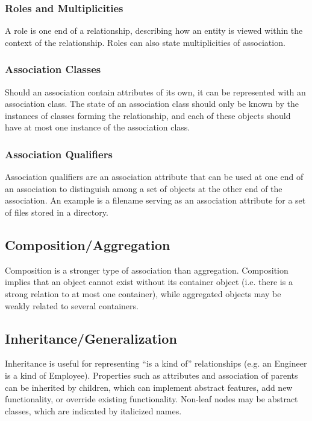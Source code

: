 \documentclass[12pt,titlepage]{article}
\begin{document}
      \subsubsection{Roles and Multiplicities}
        A role is one end of a relationship, describing how an entity is viewed within the context of the relationship. Roles can also state multiplicities of association.

      \subsubsection{Association Classes}
        Should an association contain attributes of its own, it can be represented with an association class. The state of an association class should only be known by the instances
        of classes forming the relationship, and each of these objects should have at most one instance of the association class.

      \subsubsection{Association Qualifiers}
        Association qualifiers are an association attribute that can be used at one end of an association to distinguish among a set of objects at the other end of the association.
        An example is a filename serving as an association attribute for a set of files stored in a directory.

    \subsection{Composition/Aggregation}
      Composition is a stronger type of association than aggregation. Composition implies that an object cannot exist without its container object (i.e. there is a strong relation to
      at most one container), while aggregated objects may be weakly related to several containers.

    \subsection{Inheritance/Generalization}
      Inheritance is useful for representing ``is a kind of'' relationships (e.g. an Engineer is a kind of Employee). Properties such as attributes and association of parents can be
      inherited by children, which can implement abstract features, add new functionality, or override existing functionality. Non-leaf nodes may be abstract classes, which are
      indicated by italicized names.
\end{document}
